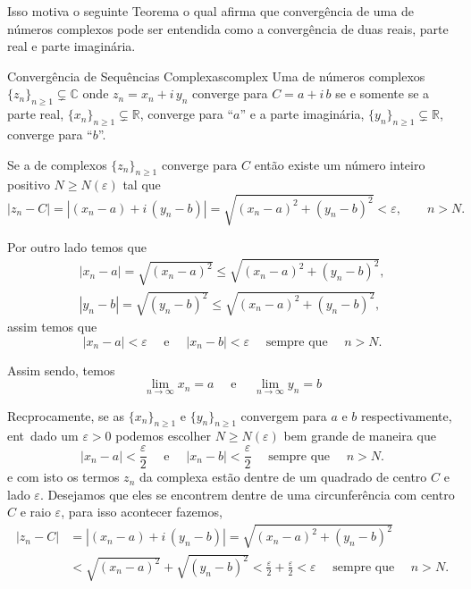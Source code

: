 Isso motiva o seguinte Teorema o qual afirma que converg\^encia de
uma \seq de n\'umeros complexos pode ser entendida como a
converg\^{e}ncia de duas \seqs reais, parte real e parte
imagin\'aria.

\begin{theoc}{Convergência de Sequências Complexas}{complex}
Uma \seq de n\'umeros complexos $\{z_n\}_{n\geq 1} \subsetneq \mathbb{C}$  onde
$z_n=x_n+i\,y_n$ converge para $C=a+i\,b$ se e somente se a \seq
parte real, $\{x_n\}_{n\geq 1} \subsetneq \mathbb{R}$, converge para ``$a$'' e a
\seq parte imagin\'aria, $\{y_n\}_{n\geq 1} \subsetneq \mathbb{R}$, converge para ``$b$''.
\end{theoc}

\prv Se a \seq de complexos $\{z_n\}_{n\geq 1}$
converge para $C$ ent\~{a}o existe um n\'{u}mero inteiro positivo $N\geq N(\varepsilon)$ tal que
\begin{equation*}
  |z_n-C|=|(x_n-a)+i\,(y_n-b)|=\sqrt{(x_n-a)^2+(y_n-b)^2}<\varepsilon,\qquad  n>N.
\end{equation*}

Por outro lado temos que
\begin{gather*}
  |x_n-a|=\sqrt{(x_n-a)^2}\leq \sqrt{(x_n-a)^2+(y_n-b)^2},\\[2ex]
  |y_n-b|=\sqrt{(y_n-b)^2}\leq \sqrt{(x_n-a)^2+(y_n-b)^2},
\end{gather*}
assim temos que
\begin{equation*}
  |x_n-a|<\varepsilon \quad  \text{ e }\quad  |x_n-b|<\varepsilon \quad\text{ sempre que }\quad   n> N.
\end{equation*}

Assim sendo, temos
\begin{equation*}
    \lim_{n\to\infty} x_n=a\quad \text{ e }\quad \lim_{n\to\infty} y_n=b
\end{equation*}

Rec\ii procamente, se as \seqs $\{x_n\}_{n\geq 1}$ e $\{y_n\}_{n\geq 1}$ convergem para $a$ e $b$ 
respectivamente,
ent\ao\ dado um $\varepsilon>0$ podemos escolher $N \geq N(\varepsilon)$ bem grande de maneira que
\begin{equation*}
|x_n-a|<\frac{\varepsilon}{2} \quad \text{ e }\quad
|x_n-b|<\frac{\varepsilon}{2} \quad\text{ sempre que }\quad  n>N.
\end{equation*}
e com isto os termos $z_n$ da \seq complexa est\~ao dentre de um
quadrado de centro $C$ e lado $\varepsilon$. Desejamos que eles se
encontrem dentre de uma circunfer\^{e}ncia com centro $C$ e raio
$\varepsilon$, para isso acontecer fazemos,
\begin{align*}
|z_n-C|&=|(x_n-a)+i\,(y_n-b)|=\sqrt{(x_n-a)^2+(y_n-b)^2}\\[2ex]
&<\sqrt{(x_n-a)^2}+\sqrt{(y_n-b)^2} <\frac{\varepsilon}{2}+\frac{\varepsilon}{2}
<\varepsilon \quad\text{ sempre que }\quad n> N.
\end{align*}

